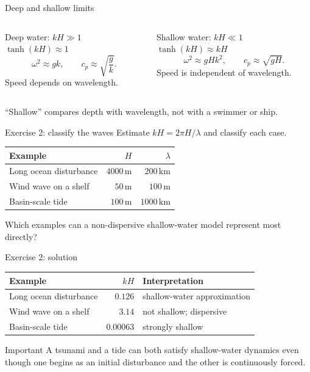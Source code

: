 \documentclass[aspectratio=169]{beamer}
\newcommand{\unit}[1]{\,\mathrm{#1}}
\begin{document}
\begin{frame}{Deep and shallow limits}
  \begin{columns}[T]
      \begin{block}{Deep water: $kH\gg1$}
        $\tanh(kH)\approx1$
        \[
          \omega^2\approx gk,
          \qquad c_p\approx\sqrt{\frac{g}{k}}.
        \]
        Speed depends on wavelength.
      \end{block}
      \begin{block}{Shallow water: $kH\ll1$}
        $\tanh(kH)\approx kH$
        \[
          \omega^2\approx gHk^2,
          \qquad c_p\approx\sqrt{gH}.
        \]
        Speed is independent of wavelength.
      \end{block}
  \end{columns}
  \vfill
  ``Shallow'' compares depth with wavelength, not with a swimmer or ship.
\end{frame}

\begin{frame}{Exercise 2: classify the waves}
  Estimate $kH=2\pi H/\lambda$ and classify each case.
  \begin{center}
  \begin{tabular}{lrr}
    \toprule
    Example & $H$ & $\lambda$ \\
    \midrule
    Long ocean disturbance & $4000\unit{m}$ & $200\unit{km}$ \\
    Wind wave on a shelf & $50\unit{m}$ & $100\unit{m}$ \\
    Basin-scale tide & $100\unit{m}$ & $1000\unit{km}$ \\
    \bottomrule
  \end{tabular}
  \end{center}
  Which examples can a non-dispersive shallow-water model represent most directly?
\end{frame}

\begin{frame}{Exercise 2: solution}
  \begin{center}
  \begin{tabular}{lrl}
    \toprule
    Example & $kH$ & Interpretation \\
    \midrule
    Long ocean disturbance & $0.126$ & shallow-water approximation \\
    Wind wave on a shelf & $3.14$ & not shallow; dispersive \\
    Basin-scale tide & $0.00063$ & strongly shallow \\
    \bottomrule
  \end{tabular}
  \end{center}
  \begin{block}{Important}
    A tsunami and a tide can both satisfy shallow-water dynamics even though one
    begins as an initial disturbance and the other is continuously forced.
  \end{block}
\end{frame}
\end{document}
